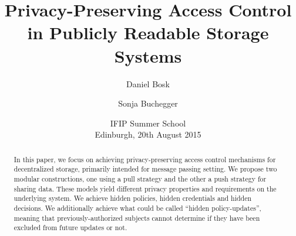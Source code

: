 \title{%
  Privacy-Preserving Access Control
  in Publicly Readable Storage Systems
}
\author{%
  Daniel Bosk \and
  Sonja Buchegger
}
\date{IFIP Summer School\\Edinburgh, 20th August 2015}

\maketitle

\mode* %

\begin{abstract}
  In this paper, we focus on achieving privacy-preserving access control 
  mechanisms for decentralized storage, primarily intended for message passing 
  setting.
  We propose two modular constructions, one using a pull strategy and the other
  a push strategy for sharing data.
  These models yield different privacy properties and requirements on the 
  underlying system.
  We achieve hidden policies, hidden credentials and hidden decisions.
  We additionally achieve what could be called \enquote{hidden policy-updates}, 
  meaning that previously-authorized subjects cannot determine if they have 
  been excluded from future updates or not.

\end{abstract}


%

